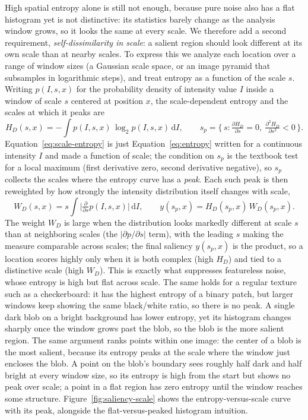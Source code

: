 High spatial entropy alone is still not enough, because pure noise also has a flat
histogram yet is not distinctive: its statistics barely change as the analysis
window grows, so it looks the same at every scale. We therefore add a second
requirement, \emph{self-dissimilarity in scale}: a salient region should look
different at its own scale than at nearby scales. To express this we analyze each
location over a range of window sizes (a Gaussian scale space, or an image pyramid
that subsamples in logarithmic steps), and treat entropy as a function of the
scale $s$. Writing $p(I,s,x)$ for the probability density of intensity value $I$
inside a window of scale $s$ centered at position $x$, the scale-dependent entropy
and the scales at which it peaks are
\begin{equation}
  H_D(s,x) = -\!\int p(I,s,x)\,\log_2 p(I,s,x)\,\mathrm{d}I,
  \qquad
  s_p = \Big\{\, s : \tfrac{\partial H_D}{\partial s}=0,\
  \tfrac{\partial^2 H_D}{\partial s^2}<0 \,\Big\}.
  \label{eq:scale-entropy}
\end{equation}
\noindent
Equation~\eqref{eq:scale-entropy} is just Equation~\eqref{eq:entropy} written for
a continuous intensity $I$ and made a function of scale; the condition on $s_p$ is
the textbook test for a local maximum (first derivative zero, second derivative
negative), so $s_p$ collects the scales where the entropy curve has a \emph{peak}.
Each such peak is then reweighted by how strongly the intensity distribution
itself changes with scale,
\begin{equation}
  W_D(s,x) = s\!\int \Big| \tfrac{\partial}{\partial s} p(I,s,x) \Big|\,\mathrm{d}I,
  \qquad
  y(s_p,x) = H_D(s_p,x)\,W_D(s_p,x).
  \label{eq:saliency-weight}
\end{equation}
\noindent
The weight $W_D$ is large when the distribution looks markedly different at scale
$s$ than at neighboring scales (the $|\partial p/\partial s|$ term), with the
leading $s$ making the measure comparable across scales; the final saliency
$y(s_p,x)$ is the product, so a location scores highly only when it is both
complex (high $H_D$) and tied to a distinctive scale (high $W_D$). This is exactly
what suppresses featureless noise, whose entropy is high but flat across scale.
The same holds for a regular texture such as a checkerboard: it has the highest
entropy of a binary patch, but larger windows keep showing the same black/white
ratio, so there is no peak. A single dark blob on a bright background has lower
entropy, yet its histogram changes sharply once the window grows past the blob,
so the blob is the more salient region. The same argument ranks points within
one image: the center of a blob is the most salient, because its entropy peaks
at the scale where the window just encloses the blob. A point on the blob's
boundary sees roughly half dark and half bright at every window size, so its
entropy is high from the start but shows no peak over scale; a point in a flat
region has zero entropy until the window reaches some structure.
Figure~\ref{fig:saliency-scale} shows the entropy-versus-scale curve with its
peak, alongside the flat-versus-peaked histogram intuition.

